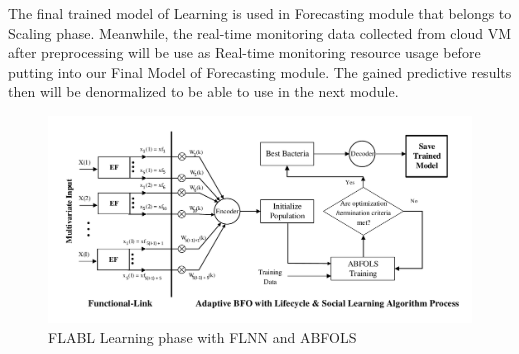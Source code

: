 \documentclass[runningheads]{llncs}
\begin{document}
The final trained model of Learning is used in Forecasting module that belongs to Scaling phase. Meanwhile, the real-time monitoring data collected from cloud VM after preprocessing will be use as Real-time monitoring resource usage before putting into our Final Model of Forecasting module. The gained predictive results then will be denormalized to be able to use in the next module.


\begin{figure}
	\begin{center}
		\includegraphics[width=1.0\textwidth =0cm 0cm 0cm 0cm, clip]{images/pdf/FLBFONN_training.pdf}
		\caption{ FLABL Learning phase with FLNN and ABFOLS }
		\label{FLBFONN_process}
	\end{center}
\end{figure}
\end{document}
